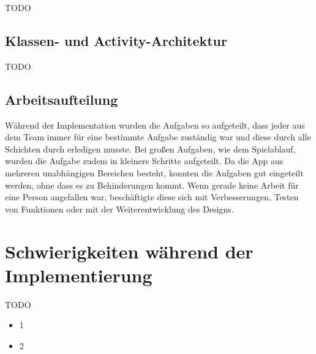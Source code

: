 TODO

\subsection{Klassen- und Activity-Architektur}
\label{sec:implementierung:architektur:klassenmodell}

TODO

\subsection{Arbeitsaufteilung}
\label{sec:implementierung:architektur:arbeitsaufteilung}

Während der Implementation wurden die Aufgaben so aufgeteilt, dass jeder aus dem Team immer für eine bestimmte Aufgabe zuständig war und diese durch alle Schichten durch erledigen musste. Bei großen Aufgaben, wie dem Spielablauf, wurden die Aufgabe zudem in kleinere Schritte aufgeteilt. Da die App aus mehreren unabhängigen Bereichen besteht, konnten die Aufgaben gut eingeteilt werden, ohne dass es zu Behinderungen kommt. Wenn gerade keine Arbeit für eine Person angefallen war, beschäftigte diese sich mit Verbesserungen, Testen von Funktionen oder mit der Weiterentwicklung des Designs.

\section{Schwierigkeiten während der Implementierung}
\label{sec:implementierung:schwierigkeiten}	

TODO

\begin{itemize} 
\item 1
\item 2
\end{itemize}




